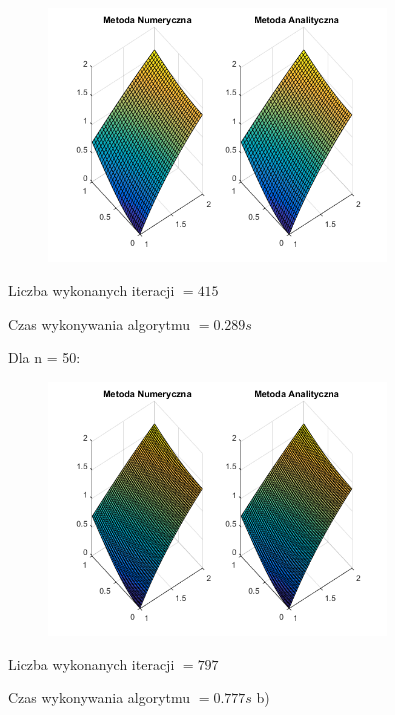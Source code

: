 \begin{figure}[!ht]
	\begin{center}
		\includegraphics[width=0.8\textwidth]{Lab6/charts/jacobi/zad1/30.png}
	\end{center}
\end{figure}

Liczba wykonanych iteracji $ = 415 $

Czas wykonywania algorytmu $ = 0.289 s$



Dla n = 50:

\begin{figure}[!ht]
	\begin{center}
		\includegraphics[width=0.8\textwidth]{Lab6/charts/jacobi/zad1/50.png}
	\end{center}
\end{figure}

Liczba wykonanych iteracji $ = 797 $

Czas wykonywania algorytmu $ = 0.777 s$
\newpage
b)

